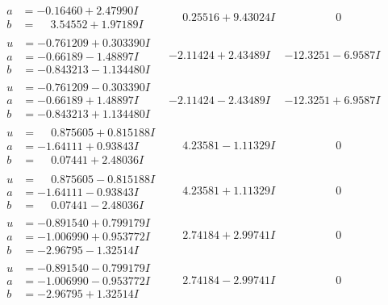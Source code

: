\documentclass[1p]{elsarticle_modified}
\theoremstyle{definition}
\begin{document}
$$\begin{array}{c|c|c}
\begin{aligned}
a &= -0.16460 + 2.47990 I \\
b &= \phantom{-}3.54552 + 1.97189 I\end{aligned}
 & \phantom{-}0.25516 + 9.43024 I & \phantom{-0.000000 } 0 \\ \hline\begin{aligned}
u &= -0.761209 + 0.303390 I \\
a &= -0.66189 - 1.48897 I \\
b &= -0.843213 - 1.134480 I\end{aligned}
 & -2.11424 + 2.43489 I & -12.3251 - 6.9587 I \\ \hline\begin{aligned}
u &= -0.761209 - 0.303390 I \\
a &= -0.66189 + 1.48897 I \\
b &= -0.843213 + 1.134480 I\end{aligned}
 & -2.11424 - 2.43489 I & -12.3251 + 6.9587 I \\ \hline\begin{aligned}
u &= \phantom{-}0.875605 + 0.815188 I \\
a &= -1.64111 + 0.93843 I \\
b &= \phantom{-}0.07441 + 2.48036 I\end{aligned}
 & \phantom{-}4.23581 - 1.11329 I & \phantom{-0.000000 } 0 \\ \hline\begin{aligned}
u &= \phantom{-}0.875605 - 0.815188 I \\
a &= -1.64111 - 0.93843 I \\
b &= \phantom{-}0.07441 - 2.48036 I\end{aligned}
 & \phantom{-}4.23581 + 1.11329 I & \phantom{-0.000000 } 0 \\ \hline\begin{aligned}
u &= -0.891540 + 0.799179 I \\
a &= -1.006990 + 0.953772 I \\
b &= -2.96795 - 1.32514 I\end{aligned}
 & \phantom{-}2.74184 + 2.99741 I & \phantom{-0.000000 } 0 \\ \hline\begin{aligned}
u &= -0.891540 - 0.799179 I \\
a &= -1.006990 - 0.953772 I \\
b &= -2.96795 + 1.32514 I\end{aligned}
 & \phantom{-}2.74184 - 2.99741 I & \phantom{-0.000000 } 0 \\ \hline\begin{aligned}

\end{aligned}
\end{array}$$
\end{document}
